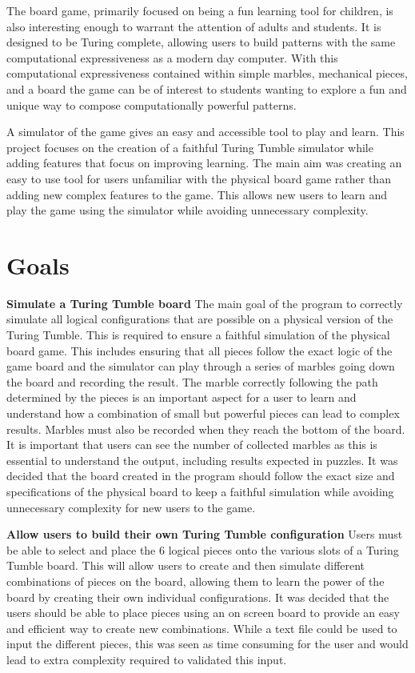 \documentclass{l4proj}
\begin{document}
The board game, primarily focused on being a fun learning tool for children, is also interesting enough to warrant the attention of adults and students. It is designed to be Turing complete, allowing users to build patterns with the same computational expressiveness as a modern day computer. With this computational expressiveness contained within simple marbles, mechanical pieces, and a board the game can be of interest to students wanting to explore a fun and unique way to compose computationally powerful patterns.  

A simulator of the game gives an easy and accessible tool to play and learn. This project focuses on the creation of a faithful Turing Tumble simulator while adding features that focus on improving learning. The main aim was creating an easy to use tool for users unfamiliar with the physical board game rather than adding new complex features to the game. This allows new users to learn and play the game using the simulator while avoiding unnecessary complexity. 


\section{Goals}
\textbf{Simulate a Turing Tumble board} The main goal of the program to correctly simulate all logical configurations that are possible on a physical version of the Turing Tumble. This is required to ensure a faithful simulation of the physical board game. This includes ensuring that all pieces follow the exact logic of the game board and the simulator can play through a series of marbles going down the board and recording the result. The marble correctly following the path determined by the pieces is an important aspect for a user to learn and understand how a combination of small but powerful pieces can lead to complex results. Marbles must also be recorded when they reach the bottom of the board. It is important that users can see the number of collected marbles as this is essential to understand the output, including results expected in puzzles. It was decided that the board created in the program should follow the exact size and specifications of the physical board to keep a faithful simulation while avoiding unnecessary complexity for new users to the game.

\textbf{Allow users to build their own Turing Tumble configuration} Users must be able to select and place the 6 logical pieces onto the various slots of a Turing Tumble board. This will allow users to create and then simulate different combinations of pieces on the board, allowing them to learn the power of the board by creating their own individual configurations. It was decided that the users should be able to place pieces using an on screen board to provide an easy and efficient way to create new combinations. While a text file could be used to input the different pieces, this was seen as time consuming for the user and would lead to extra complexity required to validated this input. 
\end{document}
